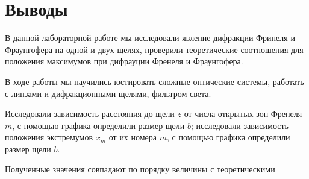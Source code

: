 \documentclass[a4paper,12pt]{article}
\begin{document}
\section{Выводы} 

В данной лабораторной работе мы исследовали явление дифракции Фринеля и Фраунгофера на одной и двух щелях, проверили теоретические соотношения для положения максимумов при дифрауции Френеля и Фраунгофера.

В ходе работы мы научились юстировать сложные оптические системы, работать с линзами и дифракционными щелями, фильтром света.

Исследовали зависимость расстояния до щели $z$ от числа открытых зон Френеля $m$, с помощью графика определили размер щели $b$; исследовали зависимость положения экстремумов $x_m$ от их номера $m$, с помощью графика определили размер щели $b$.

Полученные значения совпадают по порядку величины с теоретическими
\end{document}
